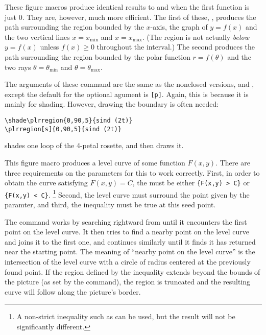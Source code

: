 \documentclass[letterpaper]{article}
\begin{document}
These figure macros produce identical results to  and
 when the first function is just $0$. They are, however,
much more efficient.  The first of these, , produces the
path surrounding the region bounded by the $x$-axis, the graph of
$y=f(x)$ and the two vertical lines $x=x_{\mathrm{min}}$ and $x =
x_{\mathrm{max}}$. (The region is not actually \emph{below} $y = f(x)$
unless $f(x) \ge 0$ throughout the interval.) The second produces the
path surrounding the region bounded by the polar function $r =
f(\theta)$ and the two rays $\theta=\theta_{\mathrm{min}}$ and
$\theta=\theta_{\mathrm{max}}$.

The arguments of these command are the same as the nonclosed versions,
 and , except the default for the optional
agument is \texttt{[p]}. Again, this is because it is mainly for
shading. However, drawing the boundary is often needed:
\begin{verbatim}
\shade\plrregion{0,90,5}{sind (2t)}
\plrregion[s]{0,90,5}{sind (2t)}
\end{verbatim}
shades one loop of the 4-petal rosette, and then draws it.

\begin{cd}
\end{cd}

This figure macro produces a level curve of some function $F(x,y)$.
There are three requirements on the parameters for this to work
correctly. First, in order to obtain the curve satisfying $F(x,y) = C$,
the  must be either \verb${F(x,y) > C}$ or
\verb${F(x,y) < C}$.%
   \footnote{A non-strict inequality such as \mfc{>=} can be
    used, but the result will not be significantly different.}
Second, the level curve must surround the point given by the 
paramter, and third, the inequality must be true at this seed point.

The command works by searching rightward from  until it
encounters the first point on the level curve. It then tries to find a
nearby point on the level curve and joins it to the first one, and
continues similarly until it finds it has returned near the starting
point. The meaning of ``nearby point on the level curve'' is the
intersection of the level curve with a circle of radius 
centered at the previously found point. If the region defined by the
inequality extends beyond the bounds of the picture (as set by the
 command), the region is truncated and the resulting curve
will follow along the picture's border.
\end{document}
